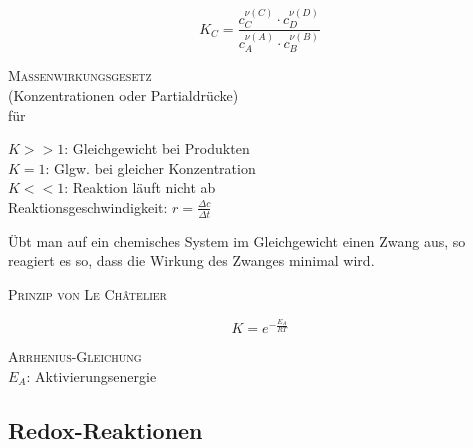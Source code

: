 \documentclass[12pt,a4paper]{article}
\renewcommand{\=}[1]{\stackrel{#1}{=}}
\theoremstyle{definition}
\theoremstyle{remark}
\begin{document}
\begin{center}
\begin{minipage}[t]{.45\linewidth}
\vspace{0pt}

\begin{framed}
$$K_C = \frac{c_C^{\nu(C)} \cdot c_D^{\nu(D)}}{c_A^{\nu(A)} \cdot c_B^{\nu(B)}}$$
\begin{center}
\textsc{Massenwirkungsgesetz}\\
\scriptsize{(Konzentrationen oder Partialdrücke)}\\
\scriptsize{für }
\end{center}
\end{framed}

$K>>1$: Gleichgewicht bei Produkten\\
$K=1$: Glgw. bei gleicher Konzentration\\
$K<<1$: Reaktion läuft nicht ab\\
Reaktionsgeschwindigkeit: $r = \frac{\Delta c}{\Delta t}$

\end{minipage}%
\hspace{0.02\linewidth}
\begin{minipage}[t]{.45\linewidth}
\vspace{0pt}

\begin{framed}
Übt man auf ein chemisches System im Gleichgewicht einen Zwang aus, so reagiert es so, dass die Wirkung des Zwanges minimal wird.
\begin{center}
\textsc{Prinzip von Le Châtelier}
\end{center}
\end{framed}

\begin{framed}
$$K = e^{-\frac{E_A}{RT}}$$
\begin{center}
\textsc{Arrhenius-Gleichung}\\
{\scriptsize $E_A$: Aktivierungsenergie}
\end{center}
\end{framed}

\end{minipage}
\end{center}


\subsection{Redox-Reaktionen}
\end{document}
